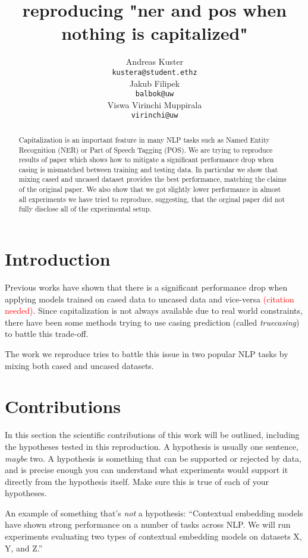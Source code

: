 \documentclass[11pt,a4paper]{article}
\title{reproducing "ner and pos when nothing is capitalized"}
\author{Andreas Kuster \\
    {\tt kustera@student.ethz} \\\And
    Jakub Filipek \\
    {\tt balbok@uw} \\\And
    Viswa Virinchi Muppirala \\
    {\tt virinchi@uw}}
\date{}
\begin{document}
\maketitle
\begin{abstract}
    Capitalization is an important feature in many NLP tasks such as Named Entity Recognition (NER) or Part of Speech Tagging (POS). We are trying to reproduce results of paper which shows how to mitigate a significant performance drop when casing is mismatched between training and testing data. In particular we show that mixing cased and uncased dataset provides the best performance, matching the claims of the original paper. We also show that we got slightly lower performance in almost all experiments we have tried to reproduce, suggesting, that the orginal paper did not fully disclose all of the experimental setup.
\end{abstract}

\section{Introduction}
Previous works have shown that there is a significant performance drop when applying models trained on cased data to uncased data and vice-versa \textcolor{red}{(citation needed)}. Since capitalization is not always available due to real world constraints, there have been some methods trying to use casing prediction (called \textit{truecasing}) to battle this trade-off.

The work we reproduce tries to battle this issue in two popular NLP tasks by mixing both cased and uncased datasets.

\section{Contributions}
In this section the scientific contributions of this work will be outlined, including the hypotheses tested in this reproduction. 
A hypothesis is usually one sentence, \emph{maybe} two. A hypothesis is something that can be supported or rejected by data, and is precise enough you can understand what experiments would support it directly from the hypothesis itself. 
Make sure this is true of each of your hypotheses.

An example of something that's \emph{not} a hypothesis: ``Contextual embedding models have shown strong performance on a number of tasks across NLP. We will run experiments evaluating two types of contextual embedding models on datasets X, Y, and Z.''
\end{document}
